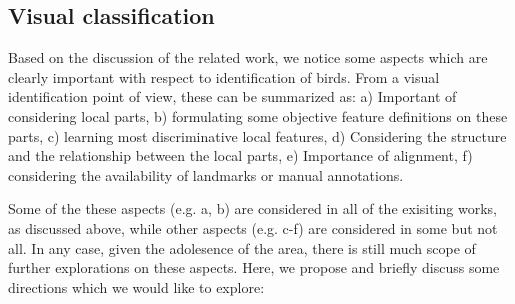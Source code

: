 \documentclass{article}
\begin{document}
\subsection{Visual classification}

Based on the discussion of the related work, we notice some aspects which are clearly important with respect to identification of birds. From a visual identification point of view, these can be summarized as: a) Important of considering local parts, b) formulating some objective feature definitions on these parts, c) learning most discriminative local features, d) Considering the structure and the relationship between the local parts, e) Importance of alignment, f) considering the availability of landmarks or manual annotations. 

Some of the these aspects (e.g. a, b) are considered  in all of the exisiting works, as discussed above, while other aspects (e.g. c-f)  are considered in some but not all. In any case, given the adolesence of the area, there is still much scope of further explorations on these aspects. Here, we propose and briefly discuss some directions which we would like to explore: 
\end{document}
